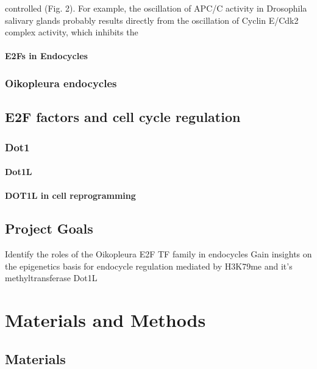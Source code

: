 \documentclass[11pt,twoside,a4paper]{report}
\begin{document}
controlled (Fig. 2). For example, the oscillation of APC/C activity in Drosophila salivary glands probably results directly from the oscillation of Cyclin E/Cdk2 complex activity, which inhibits the
		
		\subsubsection{E2Fs in Endocycles}
		
		\subsection{Oikopleura endocycles}
		
	\section{E2F factors and cell cycle regulation}

		\subsection{Dot1}
			\subsubsection{Dot1L}
			\subsubsection{DOT1L in cell reprogramming}

	
	
	
	\section{Project Goals}
		Identify the roles of the Oikopleura E2F TF family in endocycles
		Gain insights on the epigenetics basis for endocycle regulation mediated by H3K79me and it's methyltransferase Dot1L

\clearpage

\chapter{Materials and Methods}
	\section{Materials}
\end{document}
